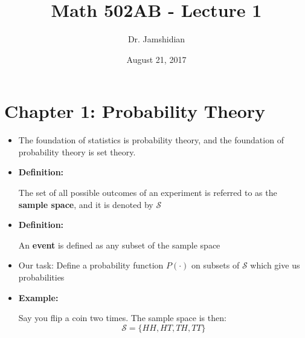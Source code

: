 \documentclass{article}
\title{Math 502AB - Lecture 1}
\author{Dr. Jamshidian}
\date{August 21, 2017}
\begin{document}
\maketitle

\section{Chapter 1: Probability Theory}

\begin{itemize}
    \item The foundation of statistics is probability theory, and the foundation of probability theory is set theory.
    \item \textbf{Definition:} 
    
    The set of all possible outcomes of an experiment is referred to as the \textbf{sample space}, and it is denoted by $\mathcal{S}$
    
    \item \textbf{Definition:} 
    
    An \textbf{event} is defined as any subset of the sample space
    
    \item Our task: Define a probability function $P(\cdot)$ on subsets of $\mathcal{S}$ which give us probabilities
    
    \item \textbf{Example:}
    
    Say you flip a coin two times. The sample space is then:
    \begin{equation*}
        \mathcal{S} = \{ HH, HT, TH, TT\}
    \end{equation*}
\end{itemize}
\end{document}
